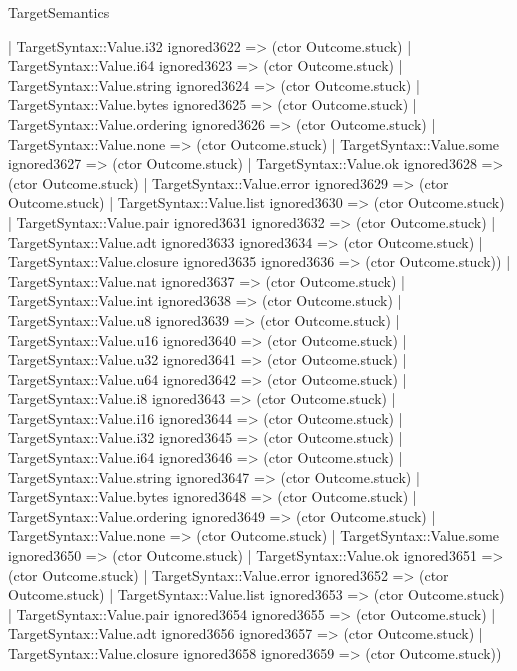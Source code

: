 \begin{lexlean}{TargetSemantics}
\begin{semanticmodule}
{              | TargetSyntax::Value.i32 ignored3622 => (ctor Outcome.stuck)
              | TargetSyntax::Value.i64 ignored3623 => (ctor Outcome.stuck)
              | TargetSyntax::Value.string ignored3624 => (ctor Outcome.stuck)
              | TargetSyntax::Value.bytes ignored3625 => (ctor Outcome.stuck)
              | TargetSyntax::Value.ordering ignored3626 => (ctor Outcome.stuck)
              | TargetSyntax::Value.none => (ctor Outcome.stuck)
              | TargetSyntax::Value.some ignored3627 => (ctor Outcome.stuck)
              | TargetSyntax::Value.ok ignored3628 => (ctor Outcome.stuck)
              | TargetSyntax::Value.error ignored3629 => (ctor Outcome.stuck)
              | TargetSyntax::Value.list ignored3630 => (ctor Outcome.stuck)
              | TargetSyntax::Value.pair ignored3631 ignored3632 => (ctor Outcome.stuck)
              | TargetSyntax::Value.adt ignored3633 ignored3634 => (ctor Outcome.stuck)
              | TargetSyntax::Value.closure ignored3635 ignored3636 => (ctor Outcome.stuck))
            | TargetSyntax::Value.nat ignored3637 => (ctor Outcome.stuck)
            | TargetSyntax::Value.int ignored3638 => (ctor Outcome.stuck)
            | TargetSyntax::Value.u8 ignored3639 => (ctor Outcome.stuck)
            | TargetSyntax::Value.u16 ignored3640 => (ctor Outcome.stuck)
            | TargetSyntax::Value.u32 ignored3641 => (ctor Outcome.stuck)
            | TargetSyntax::Value.u64 ignored3642 => (ctor Outcome.stuck)
            | TargetSyntax::Value.i8 ignored3643 => (ctor Outcome.stuck)
            | TargetSyntax::Value.i16 ignored3644 => (ctor Outcome.stuck)
            | TargetSyntax::Value.i32 ignored3645 => (ctor Outcome.stuck)
            | TargetSyntax::Value.i64 ignored3646 => (ctor Outcome.stuck)
            | TargetSyntax::Value.string ignored3647 => (ctor Outcome.stuck)
            | TargetSyntax::Value.bytes ignored3648 => (ctor Outcome.stuck)
            | TargetSyntax::Value.ordering ignored3649 => (ctor Outcome.stuck)
            | TargetSyntax::Value.none => (ctor Outcome.stuck)
            | TargetSyntax::Value.some ignored3650 => (ctor Outcome.stuck)
            | TargetSyntax::Value.ok ignored3651 => (ctor Outcome.stuck)
            | TargetSyntax::Value.error ignored3652 => (ctor Outcome.stuck)
            | TargetSyntax::Value.list ignored3653 => (ctor Outcome.stuck)
            | TargetSyntax::Value.pair ignored3654 ignored3655 => (ctor Outcome.stuck)
            | TargetSyntax::Value.adt ignored3656 ignored3657 => (ctor Outcome.stuck)
            | TargetSyntax::Value.closure ignored3658 ignored3659 => (ctor Outcome.stuck))
}
\end{semanticmodule}
\end{lexlean}
